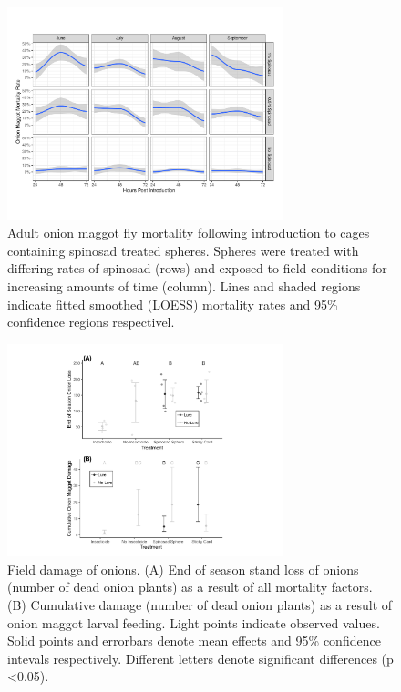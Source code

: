 \documentclass[alpha-refs]{wiley-article}
\begin{document}
\begin{figure}[bt]
\centering
\includegraphics[width = 8cm]{figures/final-figures/figure-3.pdf}
\caption{Adult onion maggot fly mortality following introduction to cages containing spinosad treated spheres.  Spheres were treated with differing rates of spinosad (rows) and exposed to field conditions for increasing amounts of time (column).  Lines and shaded regions indicate fitted smoothed (LOESS) mortality rates and 95\% confidence regions respectivel.  }
\label{fig:figure3}
\end{figure}


\begin{figure}[bt]
\centering
\includegraphics[width = 8cm]{figures/final-figures/figure-4.pdf}
\caption{Field damage of onions.  (A) End of season stand loss of onions (number of dead onion plants) as a result of all mortality factors.  (B) Cumulative damage (number of dead onion plants) as a result of onion maggot larval feeding.  Light points indicate observed values.  Solid points and errorbars denote mean effects and 95\% confidence intevals respectively.  Different letters denote significant differences (p \textless 0.05).   }
\label{fig:figure4}
\end{figure}
\end{document}

